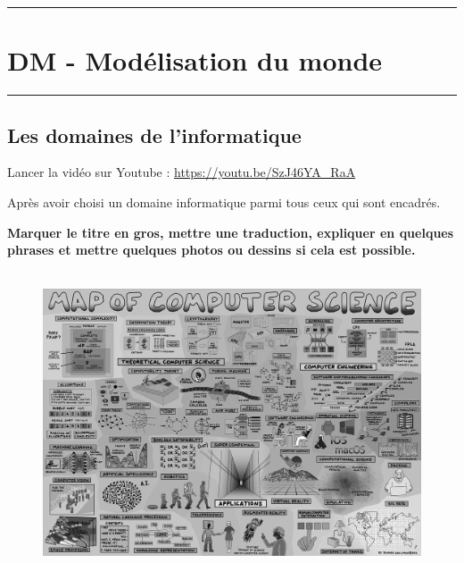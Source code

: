 \documentclass[11pt,landscape]{article}
\newcommand{\horrule}[1]{\rule{\linewidth}{#1}} %
\begin{document}
\setlength{\columnseprule}{1pt}

\horrule{2px}
\section*{DM - Modélisation du monde}
\horrule{2px}
\vspace{-1cm}

\subsection*{Les domaines de l'informatique}

Lancer la vidéo sur Youtube : \url{https://youtu.be/SzJ46YA_RaA}

Après avoir choisi un domaine informatique parmi tous ceux qui sont encadrés. 

\textbf{Marquer le titre en gros, mettre une traduction, expliquer en quelques phrases et mettre quelques photos ou dessins si cela est possible.}

    \begin{figure}[H]
        \centering
        \includegraphics[width=0.8\linewidth]{4x5-calcul-litteral-1/sources/compsci-2.png}
  \end{figure}
\end{document}
